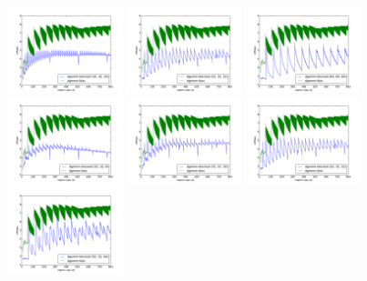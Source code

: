 \documentclass[12pt]{article}
\begin{document}
	\includegraphics[width=0.25\textwidth]{graphs/profiles/PROFILE_OUTUT_16_16.pdf}  
	\includegraphics[width=0.25\textwidth]{graphs/profiles/PROFILE_OUTUT_32_32.pdf} 
	\includegraphics[width=0.25\textwidth]{graphs/profiles/PROFILE_OUTUT_64_64.pdf} 
	\includegraphics[width=0.25\textwidth]{graphs/profiles/PROFILE_OUTUT_32_8.pdf}  
	\includegraphics[width=0.25\textwidth]{graphs/profiles/PROFILE_OUTUT_32_16.pdf}  
	\includegraphics[width=0.25\textwidth]{graphs/profiles/PROFILE_OUTUT_32_32.pdf} 
	\includegraphics[width=0.25\textwidth]{graphs/profiles/PROFILE_OUTUT_32_64.pdf} 
\end{document}
